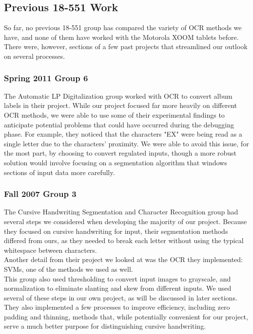 \subsection{Previous 18-551 Work}
So far, no previous 18-551 group has compared 
the variety of OCR methods we have, and none 
of them have worked with the Motorola XOOM 
tablets before. There were, however, sections of a 
few past projects that streamlined our outlook on 
several processes.

\subsubsection{Spring 2011 Group 6}
The Automatic LP Digitalization group 
worked with OCR to convert album labels 
in their project. While our project focused 
far more heavily on different OCR methods, 
we were able to use some of their experimental 
findings to anticipate potential problems that 
could have occurred during the debugging phase. 
For example, they noticed that the characters "EX" 
were being read as a single letter due to the characters'
proximity. We were able to avoid this issue, for the 
most part, by choosing to convert regulated inputs, 
though a more robust solution would involve focusing 
on a segmentation algorithm that windows sections of 
input data more carefully.

\subsubsection{Fall 2007 Group 3}
The Cursive Handwriting Segmentation and Character 
Recognition group had several steps we considered 
when developing the majority of our project. 
Because they focused on cursive handwriting for input, 
their segmentation methods differed from ours, as they needed 
to break each letter without using the typical whitespace between characters.\\
Another detail from their project we looked at was the OCR they implemented: 
SVMs, one of the methods we used as well.\\
This group also used thresholding to convert input images to 
grayscale, and normalization to eliminate slanting and skew from 
different inputs. We used several of these steps in our own project, 
as will be discussed in later sections. They also implemented a few 
processes to improve efficiency, including zero padding and thinning, 
methods that, while potentially convenient for our project, serve a much 
better purpose for distinguishing cursive handwriting.

